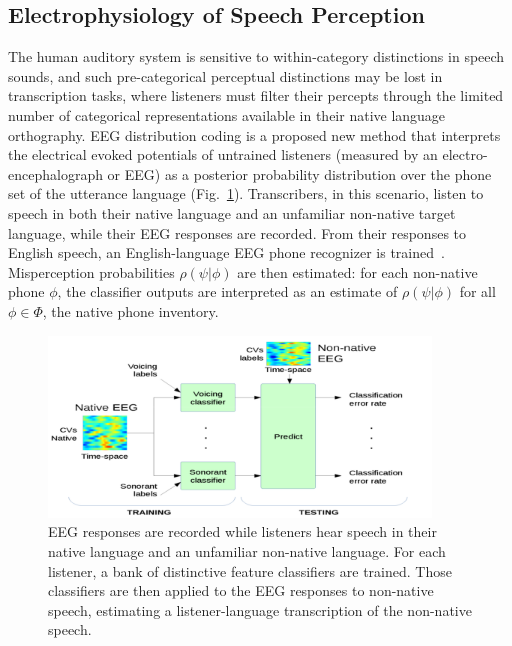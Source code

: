 \subsection{Electrophysiology of Speech Perception}

The human auditory system is sensitive to within-category distinctions
in speech sounds, and such pre-categorical perceptual distinctions may
be lost in transcription tasks, where listeners must filter their
percepts through the limited number of categorical representations
available in their native language orthography.  EEG distribution
coding is a proposed new method that interprets the electrical evoked
potentials of untrained listeners (measured by an
electro-encephalograph or EEG) as a posterior probability distribution
over the phone set of the utterance language
(Fig.~\ref{fig:eeg_paradigm}).  Transcribers, in this scenario, listen
to speech in both their native language and an unfamiliar non-native
target language, while their EEG responses are recorded.  From their
responses to English speech, an English-language EEG phone recognizer
is trained~\cite{Liberto15}.  Misperception probabilities
$\rho(\psi|\phi)$ are then estimated: for each non-native phone
$\phi$, the classifier outputs are interpreted as an estimate of
$\rho(\psi|\phi)$ for all $\phi\in\mathbb{\Phi}$, the native phone
inventory.

\begin{figure}
  \centerline{\includegraphics[width=4in]{../figs/diliberto_paradigm.png}}
  \caption{EEG responses are recorded while listeners hear speech in
    their native language and an unfamiliar non-native language.  For 
    each listener, a bank of distinctive feature classifiers are trained. 
    Those classifiers are then applied to the EEG responses to non-native
    speech, estimating a listener-language transcription of the
    non-native speech.}
  \label{fig:eeg_paradigm}
\end{figure}
